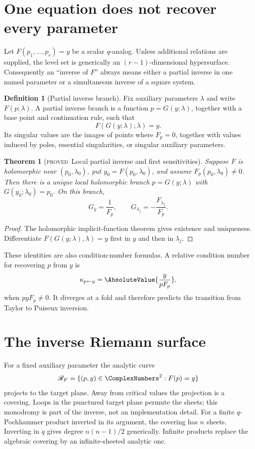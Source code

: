 \documentclass[11pt,letterpaper,oneside,openany]{book}
\newtheorem{theorem}{Theorem}[chapter]
\theoremstyle{definition}
\newtheorem{definition}{Definition}[chapter]
\theoremstyle{remark}
\newcommand{\statusproved}{\textcolor{provedgreen}{\textsc{proved}}}
\begin{document}
\section{One equation does not recover every parameter}
Let \(F(p_1,\ldots,p_r)=y\) be a scalar \(q\)-analog.  Unless additional
relations are supplied, the level set is generically an \((r-1)\)-dimensional
hypersurface.  Consequently an ``inverse of \(F\)'' always means either a
partial inverse in one named parameter or a simultaneous inverse of a square
system.

\begin{definition}[Partial inverse branch]
Fix auxiliary parameters \(\lambda\) and write \(F(p;\lambda)\).  A partial
inverse branch is a function \(p=G(y;\lambda)\), together with a base point and
continuation rule, such that
\[
 F(G(y;\lambda);\lambda)=y.
\]
Its singular values are the images of points where \(F_p=0\), together with
values induced by poles, essential singularities, or singular auxiliary
parameters.
\end{definition}

\begin{theorem}[\statusproved\ Local partial inverse and first sensitivities]
Suppose \(F\) is holomorphic near \((p_0,\lambda_0)\), put
\(y_0=F(p_0,\lambda_0)\), and assume \(F_p(p_0,\lambda_0)\ne0\).  Then there is
a unique local holomorphic branch \(p=G(y;\lambda)\) with
\(G(y_0;\lambda_0)=p_0\).  On this branch,
\[
 G_y=\frac1{F_p},
 \qquad
 G_{\lambda_j}=-\frac{F_{\lambda_j}}{F_p}.
\]
\end{theorem}
\begin{proof}
The holomorphic implicit-function theorem gives existence and uniqueness.
Differentiate \(F(G(y;\lambda),\lambda)=y\) first in \(y\) and then in
\(\lambda_j\).
\end{proof}

These identities are also condition-number formulas.  A relative condition
number for recovering \(p\) from \(y\) is
\[
 \kappa_{p\leftarrow y}=
 \AbsoluteValue{\frac{y}{pF_p}},
\]
when \(pyF_p\ne0\).  It diverges at a fold and therefore predicts the
transition from Taylor to Puiseux inversion.

\section{The inverse Riemann surface}
For a fixed auxiliary parameter the analytic curve
\[
 \mathscr R_F=\{(p,y)\in\ComplexNumbers^2:F(p)=y\}
\]
projects to the target plane.  Away from critical values the projection is a
covering.  Loops in the punctured target plane permute the sheets; this
monodromy is part of the inverse, not an implementation detail.  For a finite
\(q\)-Pochhammer product inverted in its argument, the covering has \(n\)
sheets.  Inverting in \(q\) gives degree \(n(n-1)/2\) generically.  Infinite
products replace the algebraic covering by an infinite-sheeted analytic one.
\end{document}
